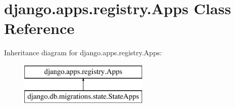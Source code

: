 \hypertarget{classdjango_1_1apps_1_1registry_1_1_apps}{}\section{django.\+apps.\+registry.\+Apps Class Reference}
\label{classdjango_1_1apps_1_1registry_1_1_apps}
Inheritance diagram for django.\+apps.\+registry.\+Apps\+:\begin{figure}[H]
\begin{center}
\leavevmode
\includegraphics[height=2.000000cm]{classdjango_1_1apps_1_1registry_1_1_apps}
\end{center}
\end{figure}
